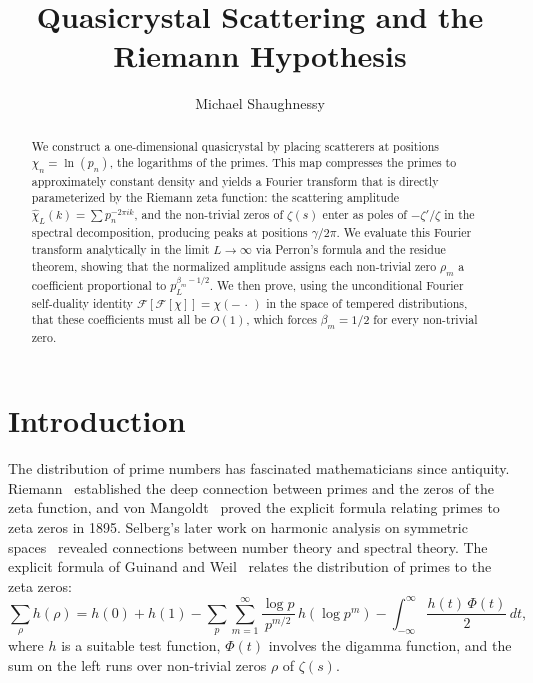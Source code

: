 \documentclass[11pt, oneside]{article}
\title{Quasicrystal Scattering and the Riemann Hypothesis}
\author{Michael Shaughnessy}
\theoremstyle{definition}
\begin{document}
\maketitle

\begin{abstract}
We construct a one-dimensional quasicrystal by placing scatterers at
positions $\chi_n = \ln(p_n)$, the logarithms of the primes.
This map compresses the primes to approximately constant density and
yields a Fourier transform that is directly parameterized by the
Riemann zeta function: the scattering amplitude
$\hat{\chi}_L(k) = \sum p_n^{-2\pi ik}$, and the non-trivial zeros
of $\zeta(s)$ enter as poles of $-\zeta'/\zeta$ in the spectral
decomposition, producing peaks at positions $\gamma/2\pi$.
We evaluate this Fourier transform analytically in the limit
$L\to\infty$ via Perron's formula and the residue theorem, showing
that the normalized amplitude assigns each non-trivial zero $\rho_m$
a coefficient proportional to $p_L^{\beta_m - 1/2}$.
We then prove, using the unconditional Fourier self-duality identity
$\mathcal{F}[\mathcal{F}[\chi]] = \chi(-\,\cdot\,)$ in the space of
tempered distributions, that these coefficients must all be $O(1)$,
which forces $\beta_m = 1/2$ for every non-trivial zero.
\end{abstract}

\section{Introduction}

The distribution of prime numbers has fascinated mathematicians
since antiquity. Riemann~\cite{Riemann1859} established the deep
connection between primes and the zeros of the zeta function,
and von Mangoldt~\cite{VonMangoldt1895} proved the explicit
formula relating primes to zeta zeros in 1895. Selberg's later
work on harmonic analysis on symmetric
spaces~\cite{Selberg1956} revealed connections between number
theory and spectral theory. The explicit formula of Guinand and
Weil~\cite{Weil} relates the distribution of primes to the
zeta zeros:
\begin{equation}
\sum_{\rho} h(\rho) = h(0) + h(1)
  - \sum_{p}\sum_{m=1}^{\infty}
    \frac{\log p}{p^{m/2}}\,h(\log p^m)
  - \int_{-\infty}^{\infty} \frac{h(t)\,\Phi(t)}{2}\,dt,
\end{equation}
where $h$ is a suitable test function, $\Phi(t)$ involves the
digamma function, and the sum on the left runs over non-trivial
zeros $\rho$ of $\zeta(s)$.
\end{document}
